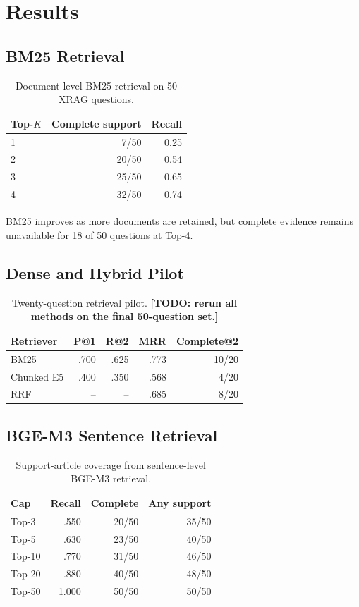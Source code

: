 \documentclass[11pt]{article}
\begin{document}
\section{Results}
\subsection{BM25 Retrieval}
\begin{table}[t]
\centering
\small
\begin{tabular}{lrr}
\toprule
Top-$K$ & Complete support & Recall \\
\midrule
1 & 7/50 & 0.25 \\
2 & 20/50 & 0.54 \\
3 & 25/50 & 0.65 \\
4 & 32/50 & 0.74 \\
\bottomrule
\end{tabular}
\caption{Document-level BM25 retrieval on 50 XRAG questions.}
\label{tab:bm25}
\end{table}

BM25 improves as more documents are retained, but complete evidence remains unavailable for 18 of 50 questions at Top-4.

\subsection{Dense and Hybrid Pilot}
\begin{table}[t]
\centering
\small
\begin{tabular}{lrrrr}
\toprule
Retriever & P@1 & R@2 & MRR & Complete@2 \\
\midrule
BM25 & .700 & .625 & .773 & 10/20 \\
Chunked E5 & .400 & .350 & .568 & 4/20 \\
RRF & -- & -- & .685 & 8/20 \\
\bottomrule
\end{tabular}
\caption{Twenty-question retrieval pilot. \textbf{[TODO: rerun all methods on the final 50-question set.]}}
\label{tab:pilot}
\end{table}

\subsection{BGE-M3 Sentence Retrieval}
\begin{table}[t]
\centering
\small
\begin{tabular}{lrrr}
\toprule
Cap & Recall & Complete & Any support \\
\midrule
Top-3 & .550 & 20/50 & 35/50 \\
Top-5 & .630 & 23/50 & 40/50 \\
Top-10 & .770 & 31/50 & 46/50 \\
Top-20 & .880 & 40/50 & 48/50 \\
Top-50 & 1.000 & 50/50 & 50/50 \\
\bottomrule
\end{tabular}
\caption{Support-article coverage from sentence-level BGE-M3 retrieval.}
\label{tab:bge}
\end{table}
\end{document}
